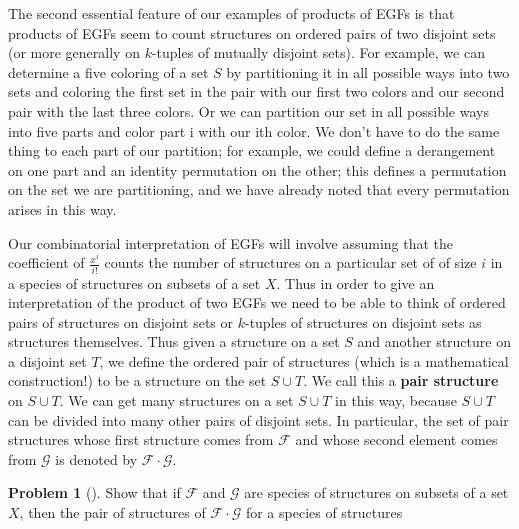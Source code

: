 \documentclass[10pt,]{book}
\newcommand{\terminology}[1]{\textbf{#1}}
\theoremstyle{plain}
\theoremstyle{definition}
\newtheorem{activity}[project]{Problem}
\theoremstyle{definition}
\numberwithin{equation}{chapter}
\newcommand{\F}{\mathcal{F}}
\begin{document}
\hypertarget{p-2121}{}%
The second essential feature of our examples of products of EGFs is that products of EGFs seem to count structures on ordered pairs of two disjoint sets (or more generally on \(k\)-tuples of mutually disjoint sets). For example, we can determine a five coloring of a set \(S\) by partitioning it in all possible ways into two sets and coloring the first set in the pair with our first two colors and our second pair with the last three colors. Or we can partition our set in all possible ways into five parts and color part i with our ith color. We don't have to do the same thing to each part of our partition; for example, we could define a derangement on one part and an identity permutation on the other; this defines a permutation on the set we are partitioning, and we have already noted that every permutation arises in this way.%
\par
\hypertarget{p-2122}{}%
Our combinatorial interpretation of EGFs will involve assuming that the coefficient of \(\frac{x^i}{i!}\) counts the number of structures on a particular set of of size \(i\) in a species of structures on subsets of a set \(X\).  Thus in order to give an interpretation of the product of two EGFs we need to be able to think of ordered pairs of structures on disjoint sets or \(k\)-tuples of structures on disjoint sets as structures themselves. Thus given a structure on a set \(S\) and another structure on a disjoint set \(T\), we define the ordered pair of structures (which is a mathematical construction!) to be a structure on the set \(S\cup T\). We call this a \terminology{pair structure}   on \(S\cup T\). We can get many structures on a set \(S\cup T\) in this way, because \(S\cup T\) can be divided into many other pairs of disjoint sets. In particular, the set of pair structures whose first structure comes from \(\F\) and whose second element comes from \(\mathcal{G}\) is denoted by \(\F\cdot \mathcal{G}\).%
\begin{activity}[]\marginsymbol[-1em]{} \label{activity-396}
\hypertarget{p-2123}{}%
Show that if \(\F\) and \(\mathcal{G}\) are species of structures on subsets of a set \(X\), then the pair of structures of \(\F\cdot\mathcal{G}\) for a species of structures%
\end{activity}
\hypertarget{p-2125}{}%
\end{document}
